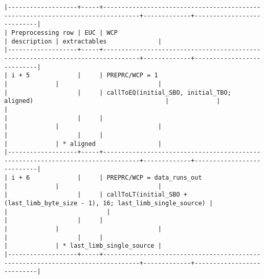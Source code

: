 \documentclass[varwidth=\maxdimen,margin=0.5cm,multi={verbatim}]{standalone}
\begin{document}
\begin{verbatim}
|-------------------+-----+--------------------------------------------------------------------------------+-------------+---------------------------|
| Preprocessing row | EUC | WCP                                                                            | description | extractables              |
|-------------------+-----+--------------------------------------------------------------------------------+-------------+---------------------------|
| i + 5             |     | PREPRC/WCP = 1                                                                 |             |                           |
|                   |     | callToEQ(initial_SBO, initial_TBO; aligned)                                    |             |                           |
|                   |     |                                                                                |             |                           |
|                   |     |                                                                                |             | * aligned                 |
|-------------------+-----+--------------------------------------------------------------------------------+-------------+---------------------------|
| i + 6             |     | PREPRC/WCP = data_runs_out                                                     |             |                           |
|                   |     | callToLT(initial_SBO + (last_limb_byte_size - 1), 16; last_limb_single_source) |             |                           |
|                   |     |                                                                                |             |                           |
|                   |     |                                                                                |             | * last_limb_single_source |
|-------------------+-----+--------------------------------------------------------------------------------+-------------+---------------------------|
\end{verbatim}
\end{document}
